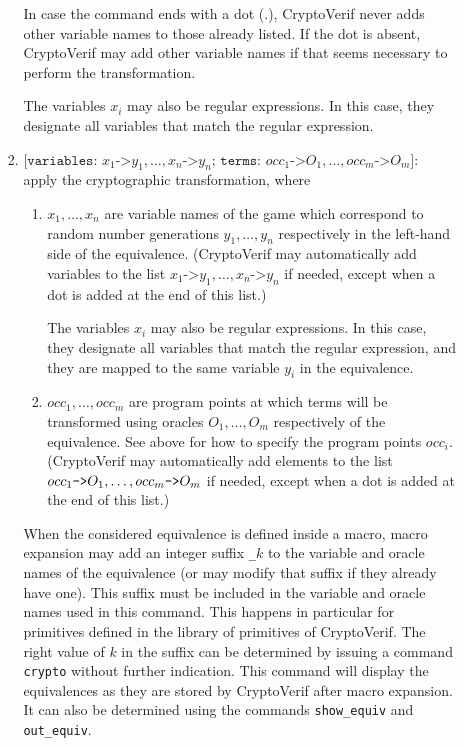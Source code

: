 \documentclass{article}
\begin{document}
\begin{itemize}
\begin{itemize}
\begin{enumerate}
In case the command ends with a dot ($\texttt{.}$), CryptoVerif never adds 
other variable names to those already listed. If the dot is absent,
CryptoVerif may add other variable names if that seems necessary to perform
the transformation.

The variables $x_i$ may also be regular expressions.
In this case, they designate all variables that match the regular expression.

\item $
\texttt{[variables: }x_1\texttt{->}y_1,\ldots, x_n\texttt{->}y_n
\texttt{; terms: }occ_1\texttt{->}O_1,\ldots,occ_m\texttt{->}O_m\texttt{]}$:
apply the cryptographic transformation, where
\begin{enumerate}

\item $x_1, \ldots, x_n$ are variable names of the game which
  correspond to random number generations $y_1, \ldots, y_n$
  respectively in the left-hand side of the equivalence. (CryptoVerif
  may automatically add variables to the list
  $x_1\texttt{->}y_1,\ldots, x_n\texttt{->}y_n$ if needed, except when
  a dot is added at the end of this list.)

The variables $x_i$ may also be regular expressions.
In this case, they designate all variables that match the regular expression,
and they are mapped to the same variable $y_i$ in the equivalence.

\item $occ_1, \ldots, occ_m$ are program points at which terms 
  will be transformed using oracles $O_1, \ldots, O_m$ respectively of
  the equivalence. See above for how to specify the program points $occ_i$. 
  (CryptoVerif may automatically add elements to the
  list $occ_1\texttt{->}O_1,\ldots,\allowbreak occ_m\texttt{->}O_m$ if needed, except
  when a dot is added at the end of this list.)

\end{enumerate}
When the considered equivalence is defined inside a macro,
macro expansion may add an integer suffix \texttt{\_$k$} to the variable
and oracle names of the equivalence (or may modify that suffix if
they already have one). This suffix must be included in
the variable and oracle names used in this command.
This happens in particular for primitives defined in the
library of primitives of CryptoVerif. The right value of $k$ in the
suffix can be determined by issuing a command \texttt{crypto} without
further indication. This command will display the equivalences
as they are stored by CryptoVerif after macro expansion.
It can also be determined using the commands \texttt{show\string_equiv}
and \texttt{out\string_equiv}.


\end{enumerate}
\end{itemize}
\end{itemize}
\end{document}
